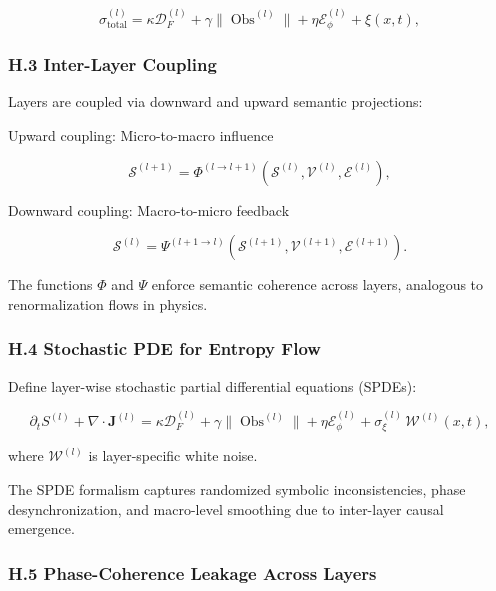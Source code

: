 \documentclass[12pt]{article}
\theoremstyle{plain}
\begin{document}
\begin{equation}
\sigma^{(l)}_{\mathrm{total}} = \kappa \mathcal{D}_F^{(l)} + \gamma \|\operatorname{Obs}^{(l)}\| + \eta \mathcal{E}_\phi^{(l)} + \xi(x,t),
\end{equation}

\subsubsection*{H.3 Inter-Layer Coupling}

Layers are coupled via downward and upward semantic projections:

Upward coupling: Micro-to-macro influence

\begin{equation}
\mathcal{S}^{(l+1)} = \Phi^{(l \to l+1)}(\mathcal{S}^{(l)}, \mathcal{V}^{(l)}, \mathcal{E}^{(l)}),
\end{equation}

Downward coupling: Macro-to-micro feedback

\begin{equation}
\mathcal{S}^{(l)} = \Psi^{(l+1 \to l)}(\mathcal{S}^{(l+1)}, \mathcal{V}^{(l+1)}, \mathcal{E}^{(l+1)}).
\end{equation}

The functions \(\Phi\) and \(\Psi\) enforce semantic coherence across layers, analogous to renormalization flows in physics.

\subsubsection*{H.4 Stochastic PDE for Entropy Flow}

Define layer-wise stochastic partial differential equations (SPDEs):

\begin{equation}
\partial_t S^{(l)} + \nabla \cdot \mathbf{J}^{(l)} = \kappa \mathcal{D}_F^{(l)} + \gamma \|\operatorname{Obs}^{(l)}\| + \eta \mathcal{E}_\phi^{(l)} + \sigma_\xi^{(l)} \, \mathcal{W}^{(l)}(x,t),
\end{equation}

where \(\mathcal{W}^{(l)}\) is layer-specific white noise.

The SPDE formalism captures randomized symbolic inconsistencies, phase desynchronization, and macro-level smoothing due to inter-layer causal emergence.

\subsubsection*{H.5 Phase-Coherence Leakage Across Layers}
\end{document}
